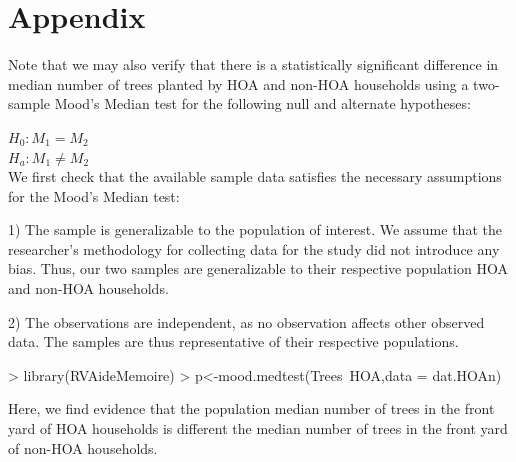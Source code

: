\documentclass{article}
\begin{document}
\section*{Appendix}

Note that we may also verify that there is a statistically significant difference in median number of trees planted by HOA and non-HOA households using a two-sample Mood's Median test for the following null and alternate hypotheses:

$H_{0}: M_{1}=M_{2}$\\
$H_{a}: M_{1} \neq M_{2}$\\

We first check that the available sample data satisfies the necessary assumptions for the Mood's Median test:

1) The sample is generalizable to the population of interest. We assume that the researcher's methodology for collecting data for the study did not introduce any bias. Thus, our two samples are generalizable to their respective population HOA and non-HOA households.

2) The observations are independent, as no observation affects other observed data. The samples are thus representative of their respective populations.


\begin{Schunk}
\begin{Sinput}
> library(RVAideMemoire)
> p<-mood.medtest(Trees~HOA,data = dat.HOAn)
\end{Sinput}
\end{Schunk}

Here, we find evidence that the population median number of trees in the front yard of HOA households is different the median number of trees in the front yard of non-HOA households. 



\end{document}
